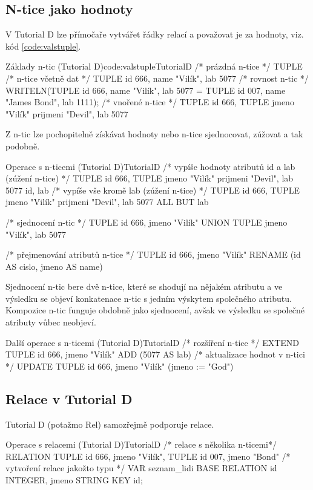 \subsection{N-tice jako hodnoty}
V Tutorial D lze přímočaře vytvářet řádky relací a považovat je za hodnoty, viz. kód \ref{code:valstuple}.
\begin{upcode}{Základy n-tic (Tutorial D)}{code:valstuple}{TutorialD}
/* prázdná n-tice */
TUPLE {}
/* n-tice včetně dat */
TUPLE {id 666, name "Vilík", lab 5077}
/* rovnost n-tic */
WRITELN(TUPLE {id 666, name "Vilík", lab 5077} = TUPLE {id 007, name "James Bond", lab 1111});
/* vnořené n-tice */
TUPLE {id 666, TUPLE {jmeno "Vilík" prijmeni "Devil"}, lab 5077}
\end{upcode}
Z n-tic lze pochopitelně získávat hodnoty nebo n-tice sjednocovat, zúžovat a tak podobně.
\begin{upcode}{Operace s n-ticemi (Tutorial D)}{}{TutorialD}
/* vypíše hodnoty atributů id a lab (zúžení n-tice) */
TUPLE {id 666, TUPLE {jmeno "Vilík" prijmeni "Devil"}, lab 5077} {id, lab}
/* vypíše vše kromě lab (zúžení n-tice) */
TUPLE {id 666, TUPLE {jmeno "Vilík" prijmeni "Devil"}, lab 5077} {ALL BUT lab}

/* sjednocení n-tic */
TUPLE {id 666, jmeno "Vilík"} UNION TUPLE {jmeno "Vilík", lab 5077}

/* přejmenování atributů n-tice */
TUPLE {id 666, jmeno "Vilík"} RENAME (id AS cislo, jmeno AS name)
\end{upcode}
Sjednocení n-tic bere dvě n-tice, které se shodují na nějakém atributu a ve výsledku se objeví konkatenace n-tic s jedním výskytem společného atributu. Kompozice n-tic funguje obdobně jako sjednocení, avšak ve výsledku se společné atributy vůbec neobjeví.
\begin{upcode}{Další operace s n-ticemi (Tutorial D)}{}{TutorialD}
/* rozšíření n-tice */
EXTEND TUPLE {id 666, jmeno "Vilík"} ADD (5077 AS lab)
/* aktualizace hodnot v n-tici */
UPDATE TUPLE {id 666, jmeno "Vilík"} (jmeno := "God")
\end{upcode}

\subsection{Relace v Tutorial D}
Tutorial D (potažmo Rel) samozřejmě podporuje relace.
\begin{upcode}{Operace s relacemi (Tutorial D)}{}{TutorialD}
/* relace s několika n-ticemi*/
RELATION {
	TUPLE {id 666, jmeno "Vilík"},
	TUPLE {id 007, jmeno "Bond"}
}
/* vytvoření relace jakožto typu */
VAR seznam_lidi BASE RELATION {id INTEGER, jmeno STRING} KEY {id};
\end{upcode}